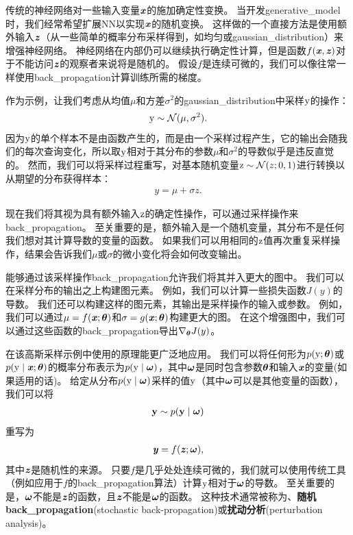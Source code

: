 传统的神经网络对一些输入变量$\boldsymbol{\mathit{x}}$的施加确定性变换。
当开发\gls{generative_model}时，我们经常希望扩展\gls{NN}以实现$\boldsymbol{\mathit{x}}$的随机变换。
这样做的一个直接方法是使用额外输入$\boldsymbol{\mathit{z}}$（从一些简单的概率分布采样得到，如均匀或\gls{gaussian_distribution}）来增强神经网络。
神经网络在内部仍可以继续执行确定性计算，但是函数$f(\boldsymbol{\mathit{x}},\boldsymbol{\mathit{z}})$对于不能访问$\boldsymbol{\mathit{z}}$的观察者来说将是随机的。
假设$f$是连续可微的，我们可以像往常一样使用\gls{back_propagation}计算训练所需的梯度。

作为示例，让我们考虑从均值$\mu$和方差$\sigma^2$的\gls{gaussian_distribution}中采样$\mathrm{y}$的操作：
\begin{align}
 \mathrm{y} \sim \mathcal{N}(\mu, \sigma^2).
\end{align}
因为$\mathrm{y}$的单个样本不是由函数产生的，而是由一个采样过程产生，它的输出会随我们的每次查询变化，所以取$\mathrm{y}$相对于其分布的参数$\mu$和$\sigma^2$的导数似乎是违反直觉的。
然而，我们可以将采样过程重写，对基本随机变量$\mathrm{z} \sim \mathcal{N}(z;0,1)$进行转换以从期望的分布获得样本：
\begin{align}
 y = \mu + \sigma z.
\end{align}

现在我们将其视为具有额外输入$\mathrm{z}$的确定性操作，可以通过采样操作来\gls{back_propagation}。
至关重要的是，额外输入是一个随机变量，其分布不是任何我们想对其计算导数的变量的函数。
如果我们可以用相同的$\mathrm{z}$值再次重复采样操作，结果会告诉我们$\mu$或$\sigma$的微小变化将会如何改变输出。


能够通过该采样操作\gls{back_propagation}允许我们将其并入更大的图中。
我们可以在采样分布的输出之上构建图元素。
例如，我们可以计算一些损失函数$J(y)$的导数。
我们还可以构建这样的图元素，其输出是采样操作的输入或参数。
例如，我们可以通过$\mu = f(\boldsymbol{\mathit{x}}; \boldsymbol{\theta})$和$\sigma = g(\boldsymbol{\mathit{x}}; \boldsymbol{\theta})$构建更大的图。
在这个增强图中，我们可以通过这些函数的\gls{back_propagation}导出$\nabla_{\boldsymbol{\theta}} J(y)$。

在该高斯采样示例中使用的原理能更广泛地应用。
我们可以将任何形为$p(\mathrm{y};\boldsymbol{\theta})$或$p(\mathrm{y} \mid \boldsymbol{\mathit{x}};\boldsymbol{\theta})$的概率分布表示为$p(\mathrm{y} \mid \boldsymbol{\omega})$，其中$\boldsymbol{\omega}$是同时包含参数$\boldsymbol{\theta}$和输入$\boldsymbol{\mathit{x}}$的变量(如果适用的话)。
给定从分布$p(\mathrm{y} \mid \boldsymbol{\omega})$采样的值$\mathrm{y}$（其中$\boldsymbol{\omega}$可以是其他变量的函数），我们可以将
\begin{align}
 \mathbf{y} \sim p(\mathbf{y}  \mid  \boldsymbol{\omega})
\end{align}
重写为
\begin{align}
 \boldsymbol{\mathit{y}} = f(\boldsymbol{\mathit{z}}; \boldsymbol{\omega}),
\end{align}
其中$\boldsymbol{\mathit{z}}$是随机性的来源。
只要$f$是几乎处处连续可微的，我们就可以使用传统工具（例如应用于$f$的\gls{back_propagation}算法）计算$\mathrm{y}$相对于$\boldsymbol{\omega}$的导数。
至关重要的是，$\boldsymbol{\omega}$不能是$\boldsymbol{\mathit{z}}$的函数，且$\boldsymbol{\mathit{z}}$不能是$\boldsymbol{\omega}$的函数。
这种技术通常被称为、\textbf{随机\gls{back_propagation}}(stochastic back-propagation)或\textbf{扰动分析}(perturbation analysis)。


